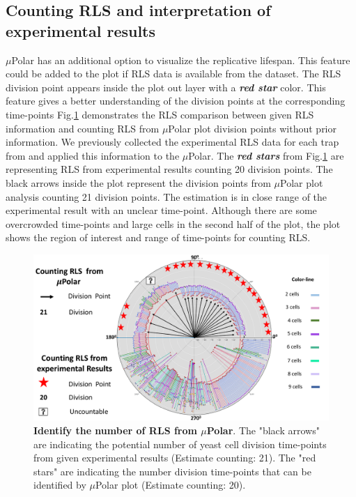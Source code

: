 \documentclass[conference]{IEEEtran}
\begin{document}
\subsection{Counting RLS and interpretation of experimental results}
$\mu$Polar has an additional option to visualize the replicative lifespan. This feature could be added to the plot if RLS data is available from the dataset. The RLS division point appears inside the plot out layer with a \textbf{\textit{red star}} color. This feature gives a better understanding of the division points at the corresponding time-points Fig.\ref{fig:rls} demonstrates the RLS comparison between given RLS information and counting RLS from $\mu$Polar plot division points without prior information. We previously collected the experimental RLS data for each trap from \cite{r13} and applied this information to the $\mu$Polar. The  \textbf{\textit{red stars}} from Fig.\ref{fig:rls} are representing RLS from experimental results counting 20 division points. The black arrows inside the plot represent the division points from $\mu$Polar plot analysis counting 21 division points. The estimation is in close range of the  experimental result with an unclear time-point. Although there are some overcrowded time-points and large cells in the second half of the plot, the plot shows the region of interest and range of time-points for counting RLS.       

\begin{figure}
\centering
\includegraphics[width=\textwidth,height=10 cm]{Patterns/rlsTp1.pdf}
\caption{ \textbf{Identify the number of RLS from $\mu$Polar}. The "black arrows" are indicating the potential number of yeast cell division time-points from given experimental results (Estimate counting: 21). The "red stars" are indicating the number division time-points that can be identified by $\mu$Polar plot (Estimate counting: 20).}
\label{fig:rls}
\end{figure}
\end{document}
